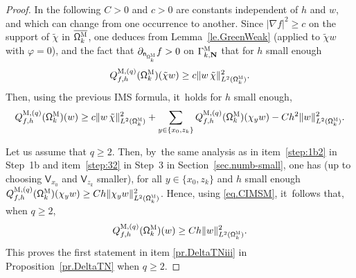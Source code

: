 \documentclass[10pt]{amsart}
\newcommand{\mbf}[1]{\mathbf{#1}}
\theoremstyle{plain}
\theoremstyle{definition}
\begin{document}
\begin{proof}
In the following $C>0$ and $c>0$ are constants independent of $h$ and $w$, and which can change from one occurrence to another.
Since $\vert \nabla f\vert^2\ge c$ on the support of $\tilde \chi$ in $\overline {\mathsf \Omega_k^{\textsc{M}}}$, one deduces from Lemma~\ref{le.GreenWeak} (applied to $\tilde \chi w$ with $\varphi=0$), and the fact that $\partial_{\mathsf n_{ \mathsf \Omega_k^{\textsc{M}}}}f>0$ on $\Gamma_{k,\mbf N}^{\textsc{M}}$ that for $h$ small enough
\[
Q_{f,h}^{\textsc{M},(q)}(\mathsf \Omega_k^{\textsc{M}})(\tilde \chi w) \ge c \Vert w\, \tilde \chi \Vert_{L^2(\mathsf \Omega_k^{\textsc{M}})}^2.
\]
Then, using the previous IMS formula, it~holds for $h$ small enough,
\begin{equation}\label{eq.CIMSM}
Q_{f,h}^{\textsc{M},(q)}(\mathsf \Omega_k^{\textsc{M}})(w)\ge c \Vert w\, \tilde \chi \Vert_{L^2(\mathsf \Omega_k^{\textsc{M}})}^2 + \sum_{y\in \{x_0,z_k\}} Q_{f,h}^{\textsc{M},(q)}(\mathsf \Omega_k^{\textsc{M}})(\chi_y w) -C h^2 \Vert w \Vert_{L^2(\mathsf \Omega_k^{\textsc{M}})}^2.
\end{equation}

Let us assume that $q\ge 2$. Then, by~the same analysis as in item~\eqref{step:1b2} in Step~1b and item~\eqref{step:32} in Step~3 in Section~\ref{sec.numb-small}, one has (up to choosing $\mathsf V_{x_0}$ and $\mathsf V_{z_k}$ smaller), for all $y \in \{x_0,z_k\}$ and $h$ small enough
$ Q_{f,h}^{\textsc{M},(q)}(\mathsf \Omega_k^{\textsc{M}})(\chi_y w)\ge Ch \Vert \chi_yw \Vert_{L^2(\mathsf \Omega_k^{\textsc{M}})}^2$.
Hence, using \eqref{eq.CIMSM}, it~follows that, when $q\ge 2$,
\[
Q_{f,h}^{\textsc{M},(q)}(\mathsf \Omega_k^{\textsc{M}})(w)\ge Ch \Vert w \Vert_{L^2(\mathsf \Omega_k^{\textsc{M}})}^2.
\]
This proves the first statement in item \eqref{pr.DeltaTNiii} in Proposition~\ref{pr.DeltaTN} when $q\ge 2$.


\end{proof}
\end{document}
